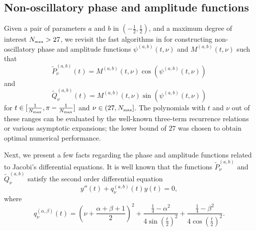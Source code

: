 \documentclass[11pt]{article}
\begin{document}
\subsection{Non-oscillatory phase and amplitude functions}
\label{sec:NPF}
Given a pair of parameters $a$ and $b$ in $\left(-\frac{1}{2},\frac{1}{2}\right)$, and a 
maximum degree of interest $N_{\mbox{\tiny max}} > 27$, we revisit the fast algorithms in \cite{Jacobi} for constructing non-oscillatory phase and amplitude functions $\psi^{(a,b)}(t,\nu)$ and $M^{(a,b)}(t,\nu)$ such that 
\begin{equation}
\tilde{P}_\nu^{(a,b)}(t) = M^{(a,b)}(t,\nu) \cos\left(\psi^{(a,b)}(t,\nu)\right)
\label{introduction:p}
\end{equation}
and
\begin{equation}
\tilde{Q}_\nu^{(a,b)}(t) = M^{(a,b)}(t,\nu) \sin\left(\psi^{(a,b)}(t,\nu)\right)
\label{introduction:q}
\end{equation}
for $t\in[\frac{1}{N_{\mbox{\tiny max}}},\pi-\frac{1}{N_{\mbox{\tiny max}}}]$ and $\nu\in(27,N_{\mbox{\tiny max}}]$. The polynomials with $t$ and $\nu$ out of these ranges can be evaluated by the well-known three-term recurrence relations or various asymptotic expansions; the lower bound of $27$ was chosen to obtain optimal numerical performance.



Next, we present a few facts regarding the phase and amplitude functions related to  Jacobi's differential equations. It is well known 
that the functions $\tilde{P}_\nu^{(a,b)}$ and $\tilde{Q}_\nu^{(a,b)}$ satisfy the second order differential equation
\begin{equation}
y''(t) + q^{(a,b)}_\nu(t) y(t) = 0,
\label{jacobieq:mod}
\end{equation}
where
\begin{dmath}
q_\nu^{(\alpha,\beta)}(t) = 
\left(\nu + \frac{\alpha+\beta+1}{2} \right)^2 
+ \frac{\frac{1}{4}-\alpha^2}{4 \sin\left(\frac{t}{2}\right)^2}
+ \frac{\frac{1}{4}-\beta^2}{4 \cos\left(\frac{t}{2}\right)^2}.
\label{jacobieq:coef}
\end{dmath}

%
\end{document}
